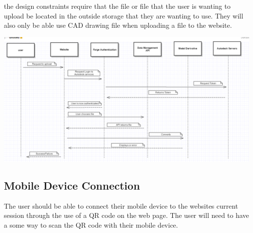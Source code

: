 \documentclass[letterpaper, 10pt, draftclsnofoot, compsoc, onecolumn]{IEEEtran}
\begin{document}
the design constraints require that the file or file that the user is wanting to upload be located in the outside storage that they are wanting to use. They will also only be able use CAD drawing file when uploading a file to the website.  

\begin{flushleft}
	\includegraphics[scale=0.5]{nonLocalUpload.png}
\end{flushleft}

\subsection{Mobile Device Connection}
	The user should be able to connect their mobile device to the websites current session through the use of a QR code on the web page. The user will need to have a some way to scan the QR code with their mobile device. 
\end{document}
